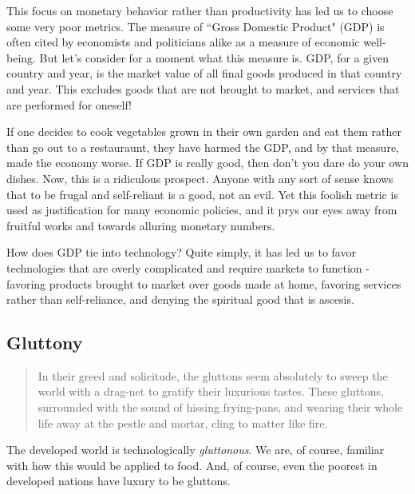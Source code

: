 \documentclass[letterpaper]{article}
\begin{document}
This focus on monetary behavior rather than productivity has led us to choose some very poor metrics. The measure of ``Gross Domestic Product" (GDP) is often cited by economists and politicians alike as a measure of economic well-being. But let's consider for a moment what this measure is. GDP, for a given country and year, is the market value of all final goods produced in that country and year. This excludes goods that are not brought to market, and services that are performed for oneself!

If one decides to cook vegetables grown in their own garden and eat them rather than go out to a restauraunt, they have harmed the GDP, and by that measure, made the economy worse. If GDP is really good, then don't you dare do your own dishes. Now, this is a ridiculous prospect. Anyone with any sort of sense knows that to be frugal and self-reliant is a good, not an evil. Yet this foolish metric is used as justification for many economic policies, and it prys our eyes away from fruitful works and towards alluring monetary numbers.

How does GDP tie into technology? Quite simply, it has led us to favor technologies that are overly complicated and require markets to function - favoring products brought to market over goods made at home, favoring services rather than self-reliance, and denying the spiritual good that is ascesis.


\subsection{Gluttony}

\begin{quote}
  In their greed and solicitude, the gluttons seem absolutely to sweep the world with a drag-net to gratify their luxurious tastes. These gluttons, surrounded with the sound of hissing frying-pans, and wearing their whole life away at the pestle and mortar, cling to matter like fire. 
\end{quote}

The developed world is technologically \textit{gluttonous}. We are, of course, familiar with how this would be applied to food. And, of course, even the poorest in developed nations have luxury to be gluttons.
\end{document}
